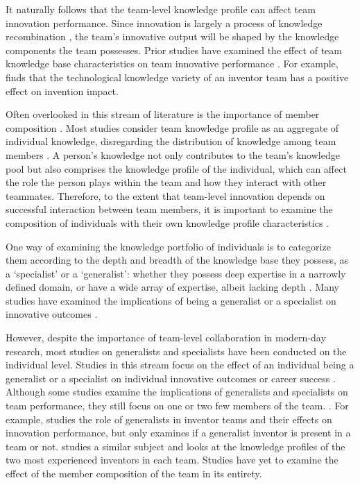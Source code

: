 \documentclass{article}
\begin{document}
It naturally follows that the team-level knowledge profile can affect team innovation performance. Since innovation is largely a process of knowledge recombination \autocite{Ahuja2001,Hargadon2002,Kaplan2015}, the team's innovative output will be shaped by the knowledge components the team possesses. Prior studies have examined the effect of team knowledge base characteristics on team innovative performance \autocite{Lee2015,Huo2019}. For example, \textcite{Huo2019} finds that the technological knowledge variety of an inventor team has a positive effect on invention impact.

Often overlooked in this stream of literature is the importance of member composition \autocite{Huo2019,Harrison2007,Bercovitz2011}. Most studies consider team knowledge profile as an aggregate of individual knowledge, disregarding the distribution of knowledge among team members \autocite{Huo2019}. A person's knowledge not only contributes to the team's knowledge pool but also comprises the knowledge profile of the individual, which can affect the role the person plays within the team and how they interact with other teammates\autocite{Melero2015,Teodoridis2019}. Therefore, to the extent that team-level innovation depends on successful interaction between team members, it is important to examine the composition of individuals with their own knowledge profile characteristics \autocite{Somech2013}.

One way of examining the knowledge portfolio of individuals is to categorize them according to the depth and breadth of the knowledge base they possess, as a `specialist' or a `generalist': whether they possess deep expertise in a narrowly defined domain, or have a wide array of expertise, albeit lacking depth \autocite{Teodoridis2019}. Many studies have examined the implications of being a generalist or a specialist on innovative outcomes \autocite{Rulke2000,Teodoridis2019,Nagle2020,Melero2015,Boh2014}.

However, despite the importance of team-level collaboration in modern-day research, most studies on generalists and specialists have been conducted on the individual level. Studies in this stream focus on the effect of an individual being a generalist or a specialist on individual innovative outcomes or career success \autocite{Teodoridis2019,Nagle2020,Boh2014}. Although some studies examine the implications of generalists and specialists on team performance, they still focus on one or two few members of the team. \autocite{Melero2015,Vakili2021}. For example, \textcite{Melero2015} studies the role of generalists in inventor teams and their effects on innovation performance, but only examines if a generalist inventor is present in a team or not. \textcite{Vakili2021} studies a similar subject and looks at the knowledge profiles of the two most experienced inventors in each team. Studies have yet to examine the effect of the member composition of the team in its entirety.
\end{document}
